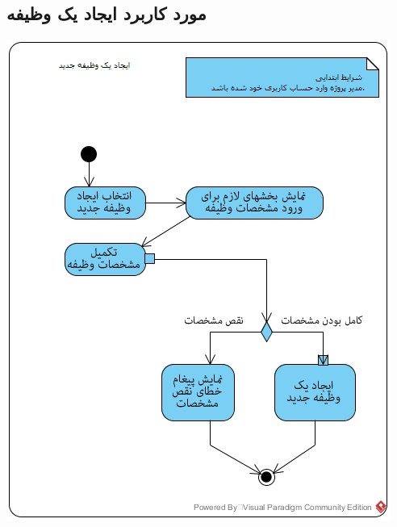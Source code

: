 \documentclass{article}
\begin{document}
\subsection*{مورد کاربرد ایجاد یک وظیفه}
\vspace{2cm}
\begin{center}
\includegraphics[width=\textwidth]{ActivityDiagrams/18.jpg}
\end{center}

\newpage
\vspace{2cm}
\end{document}
